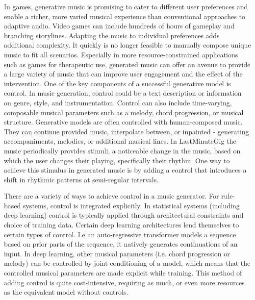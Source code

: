In games, generative music is promising to cater to different user preferences and enable a richer, more varied musical experience than conventional approaches to adaptive audio. Video games can include hundreds of hours of gameplay and branching storylines. Adapting the music to individual preferences adds additional complexity. It quickly is no longer feasible to manually compose unique music to fit all scenarios. Especially in more resource-constrained applications such as games for therapeutic use, generated music can offer an avenue to provide a large variety of music that can improve user engagement and the effect of the intervention.
One of the key components of a successful generative model is control. In music generation, control could be a text description or information on genre, style, and instrumentation. Control can also include time-varying, composable musical parameters such as a melody, chord progression, or musical structure. Generative models are often controlled with human-composed music. They can continue provided music, interpolate between, or inpainted -  generating accompaniments, melodies, or additional musical lines. In LastMinuteGig\cite{Chalkiadakis_2022} the music periodically provides stimuli, a noticeable change in the music, based on which the user changes their playing, specifically their rhythm. One way to achieve this stimulus in generated music is by adding a control that introduces a shift in rhythmic patterns at semi-regular intervals. 

There are a variety of ways to achieve control in a music generator. For rule-based systems, control is integrated explicitly. In statistical systems (including deep learning) control is typically applied through architectural constraints and choice of training data. Certain deep learning architectures lend themselves to certain types of control. I.e an auto-regressive transformer models a sequence based on prior parts of the sequence, it natively generates continuations of an input. In deep learning, other musical parameters (i.e. chord progression or melody) can be controlled by joint conditioning of a model, which means that the controlled musical parameters are made explicit while training. This method of adding control is quite cost-intensive, requiring as much, or even more resources as the equivalent model without controls. 

